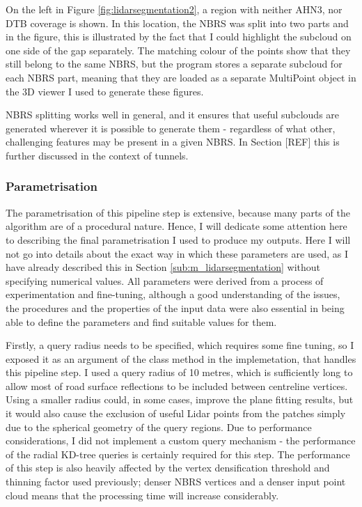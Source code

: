 On the left in Figure \ref{fig:lidarsegmentation2}, a region with neither AHN3, nor DTB coverage is shown. In this location, the NBRS was split into two parts and in the figure, this is illustrated by the fact that I could highlight the subcloud on one side of the gap separately. The matching colour of the points show that they still belong to the same NBRS, but the program stores a separate subcloud for each NBRS part, meaning that they are loaded as a separate MultiPoint object in the 3D viewer I used to generate these figures.

NBRS splitting works well in general, and it ensures that useful subclouds are generated wherever it is possible to generate them - regardless of what other, challenging features may be present in a given NBRS. In Section [REF] this is further discussed in the context of tunnels.

\subsubsection{Parametrisation}

The parametrisation of this pipeline step is extensive, because many parts of the algorithm are of a procedural nature. Hence, I will dedicate some attention here to describing the final parametrisation I used to produce my outputs. Here I will not go into details about the exact way in which these parameters are used, as I have already described this in Section \ref{sub:m_lidarsegmentation} without specifying numerical values. All parameters were derived from a process of experimentation and fine-tuning, although a good understanding of the issues, the procedures and the properties of the input data were also essential in being able to define the parameters and find suitable values for them.

Firstly, a query radius needs to be specified, which requires some fine tuning, so I exposed it as an argument of the class method in the implemetation, that handles this pipeline step. I used a query radius of 10 metres, which is sufficiently long to allow most of road surface reflections to be included between centreline vertices. Using a smaller radius could, in some cases, improve the plane fitting results, but it would also cause the exclusion of useful Lidar points from the patches simply due to the spherical geometry of the query regions. Due to performance considerations, I did not implement a custom query mechanism - the performance of the radial KD-tree queries is certainly required for this step. The performance of this step is also heavily affected by the vertex densification threshold and thinning factor used previously; denser NBRS vertices and a denser input point cloud means that the processing time will increase considerably.

